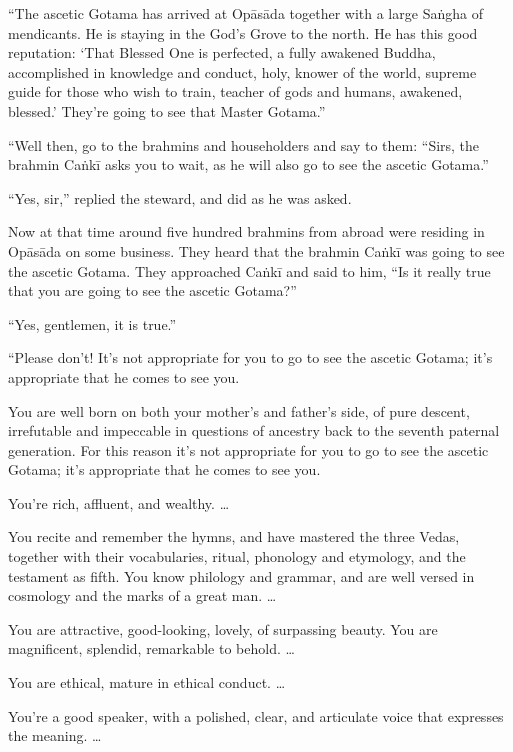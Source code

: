 \documentclass[12pt,openany]{book}%
\begin{document}
“The ascetic Gotama has arrived at \textsanskrit{Opāsāda} together with a large \textsanskrit{Saṅgha} of mendicants. He is staying in the God’s Grove to the north. He has this good reputation: ‘That Blessed One is perfected, a fully awakened Buddha, accomplished in knowledge and conduct, holy, knower of the world, supreme guide for those who wish to train, teacher of gods and humans, awakened, blessed.’ They’re going to see that Master Gotama.” 

“Well then, go to the brahmins and householders and say to them: “Sirs, the brahmin \textsanskrit{Caṅkī} asks you to wait, as he will also go to see the ascetic Gotama.” 

“Yes, sir,” replied the steward, and did as he was asked. 

Now at that time around five hundred brahmins from abroad were residing in \textsanskrit{Opāsāda} on some business. They heard that the brahmin \textsanskrit{Caṅkī} was going to see the ascetic Gotama. They approached \textsanskrit{Caṅkī} and said to him, “Is it really true that you are going to see the ascetic Gotama?” 

“Yes, gentlemen, it is true.” 

“Please don’t! It’s not appropriate for you to go to see the ascetic Gotama; it’s appropriate that he comes to see you. 

You are well born on both your mother’s and father’s side, of pure descent, irrefutable and impeccable in questions of ancestry back to the seventh paternal generation. For this reason it’s not appropriate for you to go to see the ascetic Gotama; it’s appropriate that he comes to see you. 

You’re rich, affluent, and wealthy. … 

You recite and remember the hymns, and have mastered the three Vedas, together with their vocabularies, ritual, phonology and etymology, and the testament as fifth. You know philology and grammar, and are well versed in cosmology and the marks of a great man. … 

You are attractive, good-looking, lovely, of surpassing beauty. You are magnificent, splendid, remarkable to behold. … 

You are ethical, mature in ethical conduct. … 

You’re a good speaker, with a polished, clear, and articulate voice that expresses the meaning. … 
\end{document}
